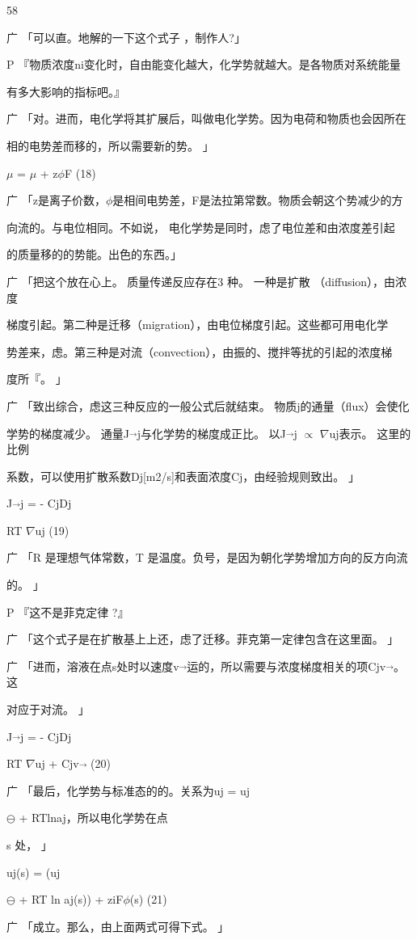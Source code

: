 58\par
广 「可以直。地解的一下这个式子 ，制作人?」\par
P 『物质浓度ni变化时，自由能变化越大，化学势就越大。是各物质对系统能量\par
有多大影响的指标吧。』\par
广 「对。进而，电化学将其扩展后，叫做电化学势。因为电荷和物质也会因所在\par
相的电势差而移的，所以需要新的势。 」\par
$\mu$ = $\mu$ + z$\phi$F (18)\par
广 「z是离子价数，$\phi$是相间电势差，F是法拉第常数。物质会朝这个势减少的方\par
向流的。与电位相同。不如说， 电化学势是同时，虑了电位差和由浓度差引起\par
的质量移的的势能。出色的东西。」\par
广 「把这个放在心上。 质量传递反应存在3 种。 一种是扩散 （diffusion），由浓度\par
梯度引起。第二种是迁移（migration），由电位梯度引起。这些都可用电化学\par
势差来，虑。第三种是对流（convection），由振的、搅拌等扰的引起的浓度梯\par
度所『。 」\par
广 「致出综合，虑这三种反应的一般公式后就结束。 物质j的通量（flux）会使化\par
学势的梯度减少。 通量J$\vec{}$j与化学势的梯度成正比。 以J$\vec{}$j $\propto$ $\nabla$uj表示。 这里的比例\par
系数，可以使用扩散系数Dj[m2/s]和表面浓度Cj，由经验规则致出。 」\par
J$\vec{}$j = - CjDj\par
RT $\nabla$uj (19)\par
广 「R 是理想气体常数，T 是温度。负号，是因为朝化学势增加方向的反方向流\par
的。 」\par
P 『这不是菲克定律 ?』\par
广 「这个式子是在扩散基上上还，虑了迁移。菲克第一定律包含在这里面。 」\par
广 「进而，溶液在点s处时以速度v$\vec{}$运的，所以需要与浓度梯度相关的项Cjv$\vec{}$。这\par
对应于对流。 」\par
J$\vec{}$j = - CjDj\par
RT $\nabla$uj + Cjv$\vec{}$ (20)\par
广 「最后，化学势与标准态的的。关系为uj = uj\par
$\ominus$ + RTlnaj，所以电化学势在点\par
s 处， 」\par
uj(s) = (uj\par
$\ominus$ + RT ln aj(s)) + ziF$\phi$(s) (21)\par
广 「成立。那么，由上面两式可得下式。 」\par

